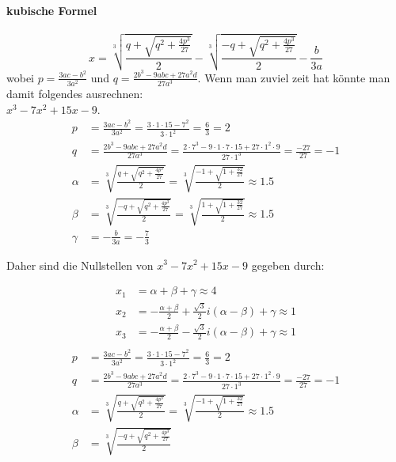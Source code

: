 \documentclass{book}
\begin{document}
\paragraph{kubische Formel}
\label{par:kubische Formel}
\[x = \sqrt[3]{\frac{q + \sqrt{q^2 + \frac{4p^3}{27}}}{2}} - \sqrt[3]{\frac{-q + \sqrt{q^2 + \frac{4p^3}{27}}}{2}} - \frac{b}{3a}\]
wobei $p = \frac{3ac - b^2}{3a^2}$ und $q = \frac{2b^3 - 9abc + 27a^2d}{27a^3}$.
Wenn man zuviel zeit hat könnte man damit folgendes ausrechnen:\\
$x^3-7x^2+15x-9$.
\begin{align*}
p &= \frac{3ac - b^2}{3a^2} = \frac{3 \cdot 1 \cdot 15 - 7^2}{3 \cdot 1^2} = \frac{6}{3} = 2 \\
q &= \frac{2b^3 - 9abc + 27a^2d}{27a^3} = \frac{2 \cdot 7^3 - 9 \cdot 1 \cdot 7 \cdot 15 + 27 \cdot 1^2 \cdot 9}{27 \cdot 1^3} = \frac{-27}{27} = -1 \\
\alpha &= \sqrt[3]{\frac{q + \sqrt{q^2 + \frac{4p^3}{27}}}{2}} = \sqrt[3]{\frac{-1 + \sqrt{1 + \frac{32}{27}}}{2}} \approx 1.5 \\
\beta &= \sqrt[3]{\frac{-q + \sqrt{q^2 + \frac{4p^3}{27}}}{2}} = \sqrt[3]{\frac{1 + \sqrt{1 + \frac{32}{27}}}{2}} \approx 1.5 \\
\gamma &= -\frac{b}{3a} = -\frac{7}{3}
\end{align*}

Daher sind die Nullstellen von $x^3 - 7x^2 + 15x - 9$ gegeben durch:

\begin{align*}
x_1 &= \alpha + \beta + \gamma \approx 4 \\
x_2 &= -\frac{\alpha + \beta}{2} + \frac{\sqrt{3}}{2}i(\alpha - \beta) + \gamma \approx 1 \\
x_3 &= -\frac{\alpha + \beta}{2} - \frac{\sqrt{3}}{2}i(\alpha - \beta) + \gamma \approx 1 \\
\end{align*}
\begin{align*}
p &= \frac{3ac - b^2}{3a^2} = \frac{3 \cdot 1 \cdot 15 - 7^2}{3 \cdot 1^2} = \frac{6}{3} = 2 \\
q &= \frac{2b^3 - 9abc + 27a^2d}{27a^3} = \frac{2 \cdot 7^3 - 9 \cdot 1 \cdot 7 \cdot 15 + 27 \cdot 1^2 \cdot 9}{27 \cdot 1^3} = \frac{-27}{27} = -1 \\
\alpha &= \sqrt[3]{\frac{q + \sqrt{q^2 + \frac{4p^3}{27}}}{2}} = \sqrt[3]{\frac{-1 + \sqrt{1 + \frac{32}{27}}}{2}} \approx 1.5 \\
\beta &= \sqrt[3]{\frac{-q + \sqrt{q^2 + \frac{4p^3}{27}}}{2}}
\end{align*}
\end{document}
